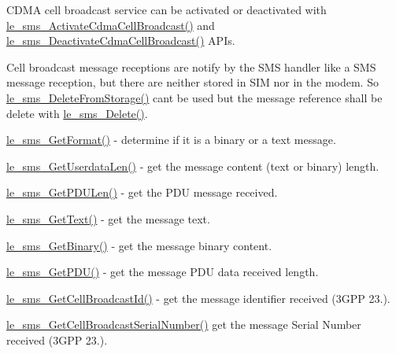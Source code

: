 C\+D\+M\+A cell broadcast service can be activated or deactivated with \hyperlink{le__sms__interface_8h_a45a160fea5a8f6cd195e3aff33830602}{le\+\_\+sms\+\_\+\+Activate\+Cdma\+Cell\+Broadcast()} and \hyperlink{le__sms__interface_8h_a26d43a50652431063e0a8e4d88fdba86}{le\+\_\+sms\+\_\+\+Deactivate\+Cdma\+Cell\+Broadcast()} A\+P\+Is.

Cell broadcast message receptions are notify by the S\+M\+S handler like a S\+M\+S message reception, but there are neither stored in S\+I\+M nor in the modem. So \hyperlink{le__sms__interface_8h_aff755186b683b94ba2788b48e28284a3}{le\+\_\+sms\+\_\+\+Delete\+From\+Storage()} can\textquotesingle{}t be used but the message reference shall be delete with \hyperlink{le__sms__interface_8h_aca1691010c88995cb47225f2889910fa}{le\+\_\+sms\+\_\+\+Delete()}.


\begin{DoxyItemize}
\item \hyperlink{le__sms__interface_8h_a5c2b8ce7043b4732c7b0ede7c5d7118c}{le\+\_\+sms\+\_\+\+Get\+Format()} -\/ determine if it is a binary or a text message.
\item \hyperlink{le__sms__interface_8h_a6165464dd3502b3c76b79b32206ba10f}{le\+\_\+sms\+\_\+\+Get\+Userdata\+Len()} -\/ get the message content (text or binary) length.
\item \hyperlink{le__sms__interface_8h_abb89b302e564f3d55d604bb0c0dda022}{le\+\_\+sms\+\_\+\+Get\+P\+D\+U\+Len()} -\/ get the P\+D\+U message received.
\item \hyperlink{le__sms__interface_8h_ac598dec158aed1e9fa134daf22c704db}{le\+\_\+sms\+\_\+\+Get\+Text()} -\/ get the message text.
\item \hyperlink{le__sms__interface_8h_a0de50069a9df99adac983385106d9c09}{le\+\_\+sms\+\_\+\+Get\+Binary()} -\/ get the message binary content.
\item \hyperlink{le__sms__interface_8h_ae4b284d427ab7ec637056a6208fdd89e}{le\+\_\+sms\+\_\+\+Get\+P\+D\+U()} -\/ get the message P\+D\+U data received length.
\item \hyperlink{le__sms__interface_8h_aa28c1d04ff19b88100b766737610b128}{le\+\_\+sms\+\_\+\+Get\+Cell\+Broadcast\+Id()} -\/ get the message identifier received (3\+G\+P\+P 23.).
\item \hyperlink{le__sms__interface_8h_aa3e075b4a9396b2e4af233e4543f40bd}{le\+\_\+sms\+\_\+\+Get\+Cell\+Broadcast\+Serial\+Number()} get the message Serial Number received (3\+G\+P\+P 23.).
\end{DoxyItemize}

